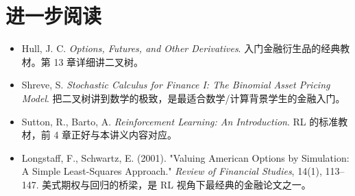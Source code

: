 \documentclass[11pt,a4paper]{ctexart}
\newcommand{\1}{\mathbf{1}}
\begin{document}
\section*{进一步阅读}

\begin{itemize}[leftmargin=*]
    \item Hull, J. C. \emph{Options, Futures, and Other Derivatives}. 入门金融衍生品的经典教材。第 13 章详细讲二叉树。
    \item Shreve, S. \emph{Stochastic Calculus for Finance I: The Binomial Asset Pricing Model}. 把二叉树讲到数学的极致，是最适合数学/计算背景学生的金融入门。
    \item Sutton, R., Barto, A. \emph{Reinforcement Learning: An Introduction}. RL 的标准教材，前 4 章正好与本讲义内容对应。
    \item Longstaff, F., Schwartz, E. (2001). "Valuing American Options by Simulation: A Simple Least-Squares Approach." \emph{Review of Financial Studies}, 14(1), 113--147. 美式期权与回归的桥梁，是 RL 视角下最经典的金融论文之一。
\end{itemize}
\end{document}
